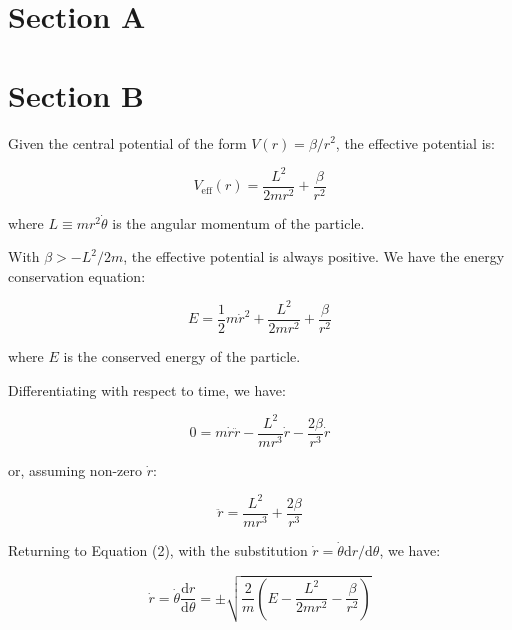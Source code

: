 \documentclass[12pt]{article}
\begin{document}



\pagebreak
\section*{Section A}


\pagebreak
\section*{Section B}



Given the central potential of the form $V(r) = \beta/r^{2}$, the effective potential is:

\begin{equation}
    V_{\text{eff}}(r) = \frac{L^{2}}{2mr^{2}} + \frac{\beta}{r^{2}}
\end{equation}

where $L \equiv mr^{2}\dot{\theta}$ is the angular momentum of the particle.

With $\beta > -L^{2}/2m$, the effective potential is always positive. We have the energy conservation equation:

\begin{equation}
    E = \frac{1}{2} m \dot{r}^{2} + \frac{L^{2}}{2mr^{2}} + \frac{\beta}{r^{2}}
\end{equation}

where $E$ is the conserved energy of the particle.

Differentiating with respect to time, we have:

\begin{equation}
    0 = m \dot{r} \ddot{r} - \frac{L^{2}}{mr^{3}} \dot{r} - \frac{2\beta}{r^{3}} \dot{r}
\end{equation}

or, assuming non-zero $\dot{r}$:

\begin{equation}
    \ddot{r} = \frac{L^{2}}{mr^{3}} + \frac{2\beta}{r^{3}}
\end{equation}

Returning to Equation (2), with the substitution $\dot{r} = \dot{\theta} \mathrm{d}r/\mathrm{d}\theta$, we have:

\begin{equation}
    \dot{r} = \dot{\theta} \frac{\mathrm{d}r}{\mathrm{d}\theta} = \pm\sqrt{\frac{2}{m} \left( E - \frac{L^{2}}{2mr^{2}} - \frac{\beta}{r^{2}} \right)}
\end{equation}
\end{document}
